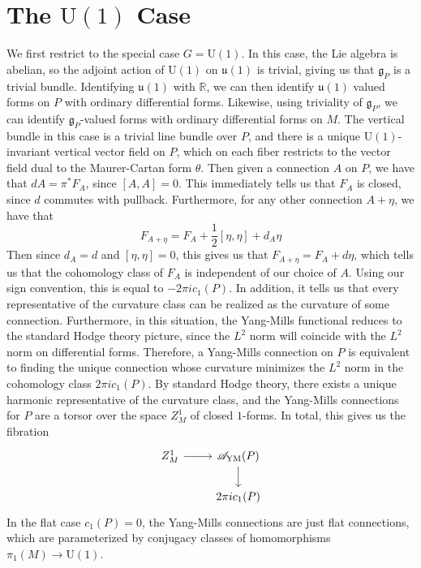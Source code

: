 \documentclass[psamsfonts, 12pt]{amsart}
\theoremstyle{definition}
\theoremstyle{remark}
\newcommand{\R}{\mathbb{R}}
\newcommand{\g}{\mathfrak{g}}
\begin{document}
\section{The $\mathrm{U}(1)$ Case}
%
We first restrict to the special case $G = \mathrm{U}(1)$. In this case, the
Lie algebra is abelian, so the adjoint action of $\mathrm{U}(1)$ on $\mathfrak{u}(1)$
is trivial, giving us that $\g_P$ is a trivial bundle. Identifying $\mathfrak{u}(1)$
with $\R$, we can then identify $\mathfrak{u}(1)$ valued forms on $P$ with ordinary
differential forms. Likewise, using triviality of $\g_P$, we can identify
$\g_P$-valued forms with ordinary differential forms on $M$. The vertical bundle
in this case is a trivial line bundle over $P$, and there is a unique
$\mathrm{U}(1)$-invariant vertical vector field on $P$, which on each fiber restricts
to the vector field dual to the Maurer-Cartan form $\theta$. Then given a connection
$A$ on $P$, we have that $dA = \pi^*F_A$, since $[A,A] = 0$. This immediately tells us
that $F_A$ is closed, since $d$ commutes with pullback. Furthermore, for any other
connection $A + \eta$, we have that
\[
F_{A+\eta} = F_A + \frac{1}{2}[\eta,\eta] + d_A\eta
\]
Then since $d_A = d$ and $[\eta,\eta] = 0$, this gives us that
$F_{A+\eta} = F_A + d\eta$, which tells us that the cohomology class of $F_A$ is
independent of our choice of $A$. Using our sign convention, this is equal to
$-2\pi i c_1(P)$. In addition, it tells us that every representative
of the curvature class can be realized as the curvature of some connection.
Furthermore, in this situation, the Yang-Mills functional reduces
to the standard Hodge theory picture, since the $L^2$ norm will coincide with the
$L^2$ norm on differential forms. Therefore, a Yang-Mills connection on $P$ is equivalent
to finding the unique connection whose curvature minimizes the $L^2$ norm in the
cohomology class $2\pi i c_1(P)$. By standard Hodge theory, there exists a unique
harmonic representative of the curvature class, and the Yang-Mills connections for $P$
are a torsor over the space $Z^1_M$ of closed $1$-forms. In total, this gives us the
fibration
\[\begin{tikzcd}
Z^1_M \ar[r] & \mathscr{A}_{\text{YM}}(P) \ar[d] \\
& 2\pi i c_1(P)
\end{tikzcd}\]
In the flat case $c_1(P) = 0$, the Yang-Mills connections
are just flat connections, which are parameterized by conjugacy classes of homomorphisms
$\pi_1(M) \to \mathrm{U}(1)$. \\
\end{document}

